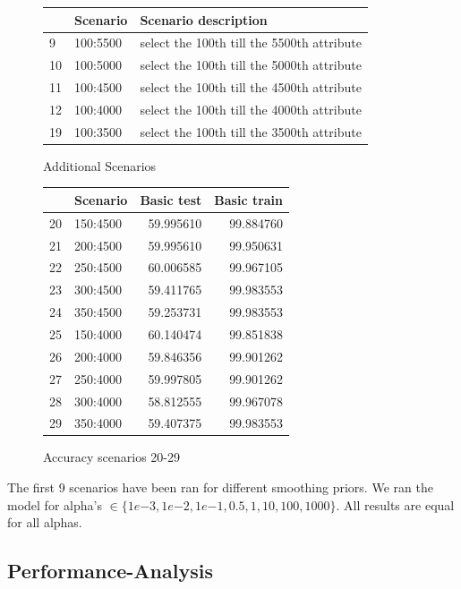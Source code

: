 \documentclass[11pt]{article}
\begin{document}
\begin{figure}[h]
\begin{tabular}{lll}
\toprule
{} &   Scenario &  Scenario description \\
\midrule
9 &  100:5500 & select the 100th till the 5500th attribute    \\
10 &   100:5000 & select the 100th till the 5000th attribute    \\
11 &   100:4500 & select the 100th till the 4500th attribute	\\ 
12 &   100:4000 & select the 100th till the 4000th attribute    \\
19 &   100:3500 & select the 100th till the 3500th attribute	\\ 
\bottomrule
\end{tabular}
\caption{Additional Scenarios}
\label{Tab:: Additional scenarios}
\end{figure}
%
\begin{figure}
\begin{tabular}{llrr}
\toprule
{} &  Scenario &  Basic test &  Basic train \\
\midrule
20 &  150:4500 &   59.995610 &    99.884760 \\
21 &  200:4500 &   59.995610 &    99.950631 \\
22 &  250:4500 &   60.006585 &    99.967105 \\
23 &  300:4500 &   59.411765 &    99.983553 \\
24 &  350:4500 &   59.253731 &    99.983553 \\
25 &  150:4000 &   60.140474 &    99.851838 \\
26 &  200:4000 &   59.846356 &    99.901262 \\
27 &  250:4000 &   59.997805 &    99.901262 \\
28 &  300:4000 &   58.812555 &    99.967078 \\
29 &  350:4000 &   59.407375 &    99.983553 \\
\bottomrule
\end{tabular}
\caption{Accuracy scenarios 20-29}
\label{Scenrios 20-29}
\end{figure}

The first 9 scenarios have been ran for different smoothing priors. We ran the model for alpha's $\in \{1e{-3}, 1e{-2}, 1e{-1}, 0.5, 1, 10, 100, 1000\}$. All results are equal for all alphas. 
\subsection{Performance-Analysis}
\end{document}
